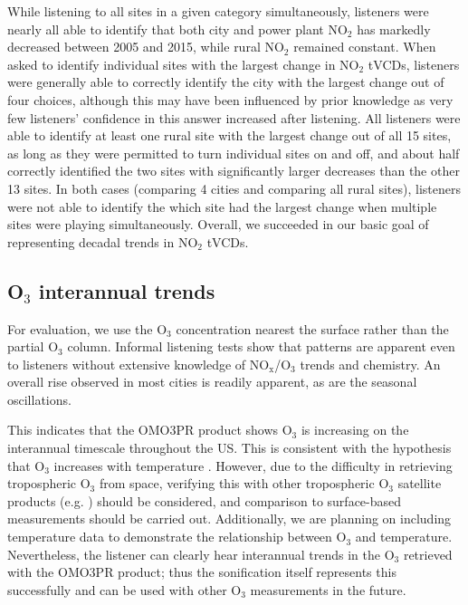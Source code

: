\documentclass[a4paper,10pt,oneside]{article}
\newcommand{\ce}[1]{$\mathrm{#1}$}
\begin{document}
\begin{sloppy}
While listening to all sites in a given category simultaneously, listeners were nearly all able to identify that both city and power plant \ce{NO_2} has markedly decreased between 2005 and 2015, while rural \ce{NO_2} remained constant. When asked to identify individual sites with the largest change in \ce{NO_2} tVCDs, listeners were generally able to correctly identify the city with the largest change out of four choices, although this may have been influenced by prior knowledge as very few listeners' confidence in this answer increased after listening. All listeners were able to identify at least one rural site with the largest change out of all 15 sites, as long as they were permitted to turn individual sites on and off, and about half correctly identified the two sites with significantly larger decreases than the other 13 sites. In both cases (comparing 4 cities and comparing all rural sites), listeners were not able to identify the which site had the largest change when multiple sites were playing simultaneously.  Overall, we succeeded in our basic goal of representing decadal trends in \ce{NO_2} tVCDs.

\subsection{O$_3$ interannual trends}
For evaluation, we use the \ce{O_3} concentration nearest the surface rather than the partial \ce{O_3} column.  Informal listening tests show that patterns are apparent even to listeners without extensive knowledge of \ce{NO_x}/\ce{O_3} trends and chemistry.  An overall rise observed in most cities is readily apparent, as are the seasonal oscillations.

This indicates that the OMO3PR product shows \ce{O_3} is increasing on the interannual timescale throughout the US. This is consistent with the hypothesis that \ce{O_3} increases with temperature \cite{lin17}. However, due to the difficulty in retrieving tropospheric \ce{O_3} from space, verifying this with other tropospheric \ce{O_3} satellite products (e.g. \cite{choi08}) should be considered, and comparison to surface-based measurements should be carried out. Additionally, we are planning on including temperature data to demonstrate the relationship between \ce{O_3} and temperature.  Nevertheless, the listener can clearly hear interannual trends in the \ce{O_3} retrieved with the OMO3PR product; thus the sonification itself represents this successfully and can be used with other \ce{O_3} measurements in the future.


\end{sloppy}
\end{document}
